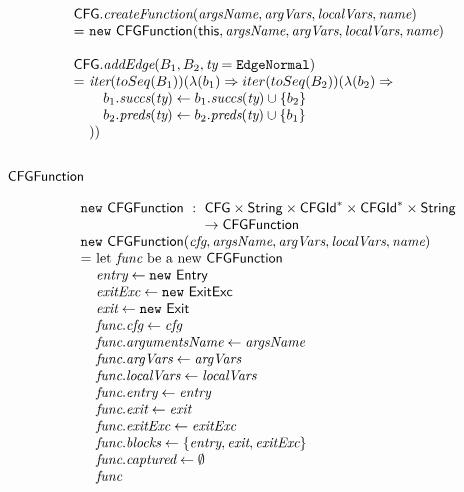 \[
\begin{array}{l@{}l@{~}l}
\lefteqn{\CFG.\emph{createFunction}(\emph{argsName}, \emph{argVars}, \emph{localVars}, \emph{name})}\\
& = & \new\ \CFGFunction(\this, \emph{argsName}, \emph{argVars}, \emph{localVars}, \emph{name})\\
& & \\

\lefteqn{\CFG.\emph{addEdge}(B_1, B_2, \emph{ty} = \EdgeNormal)}\\
& = & \iter(toSeq(B_1))(\lambda(b_1) \Rightarrow iter(toSeq(B_2))(\lambda(b_2) \Rightarrow \\
& & \quad b_1.\emph{succs}(\emph{ty}) \leftarrow b_1.\emph{succs}(\emph{ty}) \cup \{b_2\} \\
& & \quad b_2.\emph{preds}(\emph{ty}) \leftarrow b_2.\emph{preds}(\emph{ty}) \cup \{b_1\} \\
& & )) \\
\end{array}
\]

\subsection{$\mbox{\textsf{CFGFunction}}$}
\[
\begin{array}{l@{}l@{~}l}
\lefteqn{\new \ \CFGFunction \ : \ \CFG \times \String \times \CFGId^{*} \times \CFGId^{*} \times \String}\\
\lefteqn{\phantom{\new \ \CFGFunction \ : \ }\rightarrow \CFGFunction}\\
\lefteqn{\new\ \CFGFunction(\emph{cfg}, \emph{argsName}, \emph{argVars}, \emph{localVars}, \emph{name})}\\
& = & \text{let } \emph{func} \text{ be a new } \CFGFunction\\
& & \emph{entry} \leftarrow \new\ \Entry\\
& & \emph{exitExc} \leftarrow \new\ \ExitExc\\
& & \emph{exit} \leftarrow \new\ \Exit\\
& & \emph{func}.\emph{cfg} \leftarrow \emph{cfg} \\
& & \emph{func}.\emph{argumentsName} \leftarrow \emph{argsName} \\
& & \emph{func}.\emph{argVars} \leftarrow \emph{argVars}\\
& & \emph{func}.\emph{localVars} \leftarrow \emph{localVars}\\
& & \emph{func}.\emph{entry} \leftarrow \emph{entry}\\
& & \emph{func}.\emph{exit} \leftarrow \emph{exit}\\
& & \emph{func}.\emph{exitExc} \leftarrow \emph{exitExc}\\
& & \emph{func}.\emph{blocks} \leftarrow \{ \emph{entry}, \emph{exit}, \emph{exitExc} \}
~~~~~~~~~~~~~~~~~~~~~~~~~~~~\\
& & \emph{func}.\emph{captured} \leftarrow \emptyset\\
& & \emph{func}\\
\end{array}
\]

